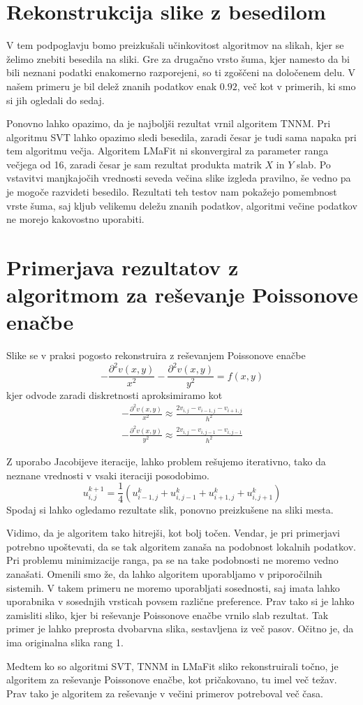 \section{Rekonstrukcija slike z besedilom}
V tem podpoglavju bomo preizkušali učinkovitost algoritmov na slikah, kjer se želimo znebiti besedila na sliki. Gre za drugačno vrsto šuma, kjer namesto da bi bili neznani podatki enakomerno razporejeni, so ti zgoščeni na določenem delu. V našem primeru je bil delež znanih podatkov enak $0.92$, več kot v primerih, ki smo si jih ogledali do sedaj.


Ponovno lahko opazimo, da je najboljši rezultat vrnil algoritem TNNM. Pri algoritmu SVT lahko opazimo sledi besedila, zaradi česar je tudi sama napaka pri tem algoritmu večja. Algoritem LMaFit ni skonvergiral za parameter ranga večjega od 16, zaradi česar je sam rezultat produkta matrik $X$ in $Y$ slab. Po vstavitvi  manjkajočih vrednosti seveda večina slike izgleda pravilno, še vedno pa je mogoče razvideti besedilo. 
Rezultati teh testov nam pokažejo pomembnost vrste šuma, saj kljub velikemu deležu znanih podatkov, algoritmi večine podatkov ne morejo kakovostno uporabiti.

\section{Primerjava rezultatov z algoritmom za reševanje Poissonove enačbe}
Slike se v praksi pogosto rekonstruira z reševanjem Poissonove enačbe
\[
    -\frac{\partial^2v(x, y)}{x^2} - \frac{\partial^2v(x, y)}{y^2} = f(x,y)
\]
kjer odvode zaradi diskretnosti aproksimiramo kot 
\begin{align*}
    -\frac{\partial^2v(x, y)}{x^2} \approx \frac{2v_{i,j} - v_{i-1, j} - v_{i+1, j}}{h^2} \\
    -\frac{\partial^2v(x, y)}{y^2} \approx \frac{2v_{i,j} - v_{i, j-1} - v_{i, j-1}}{h^2}
\end{align*}

Z uporabo Jacobijeve iteracije, lahko problem rešujemo iterativno, tako da neznane vrednosti v vsaki iteraciji posodobimo.
\[
  u_{i, j}^{k+1} = \frac{1}{4}(u_{i - 1, j}^k +  u_{i, j - 1}^k + u_{i + 1, j}^k + u_{i, j + 1}^k)
\]
Spodaj si lahko ogledamo rezultate slik, ponovno preizkušene na sliki mesta.

\FloatBarrier

Vidimo, da je algoritem tako hitrejši, kot bolj točen. Vendar, je pri primerjavi potrebno upoštevati, da se tak algoritem zanaša na podobnost lokalnih podatkov. Pri problemu minimizacije ranga, pa se na take podobnosti ne moremo vedno zanašati. Omenili smo že, da lahko algoritem uporabljamo v priporočilnih sistemih. V takem primeru ne moremo uporabljati sosednosti, saj imata lahko uporabnika v sosednjih vrsticah povsem različne preference. Prav tako si je lahko zamisliti sliko, kjer bi reševanje Poissonove enačbe vrnilo slab rezultat. Tak primer je lahko preprosta dvobarvna slika, sestavljena iz več pasov. Očitno je, da ima originalna slika rang 1. 


\FloatBarrier
Medtem ko so algoritmi SVT, TNNM in LMaFit sliko rekonstruirali točno, je algoritem za reševanje Poissonove enačbe, kot pričakovano, tu imel več težav. Prav tako je algoritem za reševanje v večini primerov potreboval več časa.